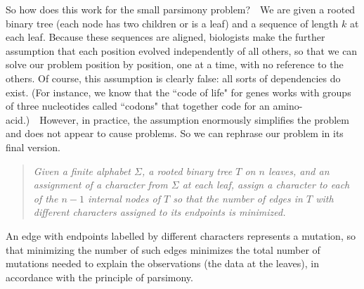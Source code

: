 \documentclass[11pt]{article}
\begin{document}
So how does this work for the small parsimony problem?\ \ We are given
a rooted binary tree (each node has two children or is a leaf) and a
sequence of length $k$ at each leaf.  Because these sequences are aligned,
biologists make the further assumption that each position evolved independently
of all others, so that we can solve our problem position by position, one
at a time, with no reference to the others.  Of course, this assumption is
clearly false: all sorts of dependencies do exist.  (For instance, we know
that the ``code of life" for genes works with groups of three nucleotides
called ``codons" that together code for an amino-acid.)\ \ However,
in practice, the assumption enormously simplifies the problem and does not
appear to cause problems.  So we can rephrase our problem in its final version.
\begin{quote}
  \it
  Given a finite alphabet $\Sigma$, a rooted binary tree $T$ on $n$ leaves,
  and an assignment of a character from $\Sigma$ at each leaf, assign
  a character to each of the $n-1$ internal nodes of $T$ so that the number
  of edges in $T$ with different characters assigned to its endpoints
  is minimized.
\end{quote}
An edge with endpoints labelled by different characters
represents a mutation, so that minimizing the number of such edges minimizes
the total number of mutations needed to explain the observations (the
data at the leaves), in accordance with the principle of parsimony.
\end{document}
